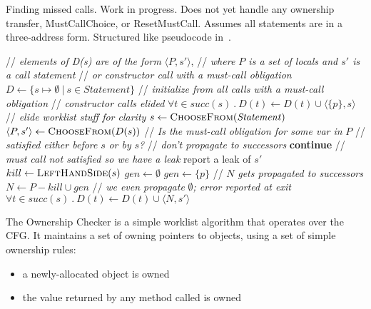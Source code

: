 

\begin{algorithm}[t]
  \caption{Finding missed calls.  Work in progress.
  Does not yet handle any ownership transfer, MustCallChoice, 
  or ResetMustCall.  Assumes all statements are in a three-address form.
  Structured like pseudocode in~\cite{TorlakC10}.}
  \label{alg:find-copies}
  \begin{algorithmic}[1]
  \State // \textit{elements of D(s) are of the form} $\langle P, s' \rangle$,
  \State // \textit{where $P$ is a set of locals and $s'$ is a call statement}
  \State // \textit{or constructor call with a must-call obligation}
  \State $D \gets \{ s \mapsto \emptyset\ |\ s \in \mathit{Statement} \}$
  \State // \textit{initialize from all calls with a must-call obligation}
    \State // \textit{constructor calls elided}
    \State $\forall t \in \mathit{succ}(s)\ .\ D(t) \leftarrow D(t) \cup \langle \{p\}, s \rangle$
    \EndIf
  \EndFor
  \State // \textit{elide worklist stuff for clarity}
    \State $s \gets \textsc{ChooseFrom}(\mathit{Statement})$
    \State $\langle P, s' \rangle \gets \textsc{ChooseFrom}(D(s))$
    \State // \textit{Is the must-call obligation for some var in } $P$
    \State // \textit{satisfied either before }$s$\textit{ or by } $s$\textit{?}
    \State // \textit{don't propagate to successors}
    \State \textbf{continue} 
    \EndIf
    \State // \textit{must call not satisfied so we have a leak}
    \State report a leak of $s'$
    \EndIf
    \State $kill \gets \textsc{LeftHandSide}(s)$
    \State $gen \gets \emptyset$
    \State $gen \gets \{p\}$
    \EndIf
    \State // $N$ \textit{gets propagated to successors}
    \State $N \gets P - kill \cup gen$
    \State // \textit{we even propagate }$\emptyset$\textit{; error reported at exit}
    \State $\forall t \in \mathit{succ}(s)\ .\ D(t) \leftarrow D(t) \cup \langle N, s' \rangle$
  \EndWhile \label{li:alg-loop-end}
  \EndProcedure
  \end{algorithmic}
\end{algorithm}


The Ownership Checker is a simple worklist algorithm that operates over the CFG.
It maintains a set of owning pointers to objects, using a set of simple
ownership rules:
\begin{itemize}
\item a newly-allocated object is owned
\item the value returned by any method called is owned
\end{itemize}


